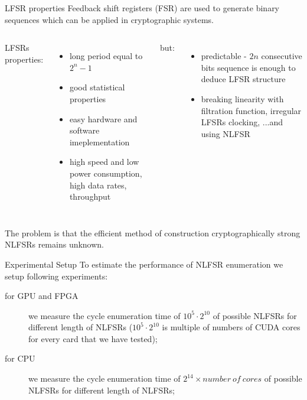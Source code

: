 \documentclass[10pt, compress]{beamer}
\begin{document}
\begin{frame}{LFSR properties}
Feedback shift registers (FSR) are used to generate binary sequences which can be applied in cryptographic systems.
\vspace{1em}
\begin{columns}
LFSRs properties:
\begin{itemize}
    \item long period equal to $2^n-1$
    \item good statistical properties
    \item easy hardware and software imeplementation
    \item high speed and low power consumption, high data rates, throughput
\end{itemize}
but:
\begin{itemize}
    \item predictable - $2n$ consecutive bits sequence is enough to deduce LFSR structure
    \item breaking linearity with filtration function, irregular LFSRs clocking, ...and using NLFSR
\end{itemize}
\end{columns}
The problem is that the efficient method of construction cryptographically strong NLFSRs remains unknown.
\end{frame}

\begin{frame}{Experimental Setup}
To estimate the performance of NLFSR enumeration we setup following experiments:
\begin{description}
\item[for GPU and FPGA] we measure the cycle enumeration time of $10^{5} \cdot 2^{10}$ of possible NLFSRs for different length of NLFSRs ($10^{5} \cdot 2^{10}$ is multiple of numbers of CUDA cores for every card that we have tested);
\item[for CPU] we measure the cycle enumeration time of $2^{14} \times number \ of \ cores$ of possible NLFSRs for different length of NLFSRs;
\end{description}
\end{frame}
\end{document}
